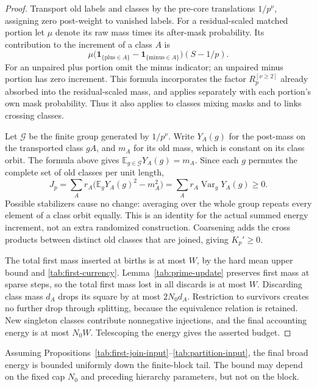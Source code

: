 \begin{proof}
Transport old labels and classes by the pre-core translations
$1/p^\nu$, assigning zero post-weight to vanished labels.
For a residual-scaled matched portion let $\mu$ denote its raw
mass times its after-mask probability.  Its contribution to the
increment of a class $A$ is
\[
 \mu\bigl(\mathbf1_{\{\text{plus}\in A\}}
          -\mathbf1_{\{\text{minus}\in A\}}\bigr)(S-1/p).
\]
For an unpaired plus portion omit the minus indicator; an unpaired
minus portion has zero increment.  This formula incorporates the
factor $R_p^{[\nu\ge2]}$ already absorbed into the residual-scaled
mass, and applies separately with each portion's own mask probability.
Thus it also applies to classes mixing masks and to links crossing
classes.

Let $\mathcal G$ be the finite group generated by $1/p^\nu$.
Write $Y_A(g)$ for the post-mass on the transported class $gA$,
and $m_A$ for its old mass, which is constant on its class orbit.
The formula above gives $\mathbb E_{g\in\mathcal G}Y_A(g)=m_A$.
Since each $g$ permutes the complete set of old classes per unit
length,
\[
 J_p=\sum_A r_A\bigl(\mathbb E_gY_A(g)^2-m_A^2\bigr)
     =\sum_A r_A\operatorname{Var}_g Y_A(g)\ge0.
\]
Possible stabilizers cause no change: averaging over the whole group
repeats every element of a class orbit equally.  This is an identity
for the actual summed energy increment, not an extra randomized
construction.  Coarsening adds the cross products between distinct
old classes that are joined, giving $K_p'\ge0$.

The total first mass inserted at births is at most $W$, by the
hard mean upper bound and \eqref{tab:first-currency}.
Lemma~\ref{tab:prime-update} preserves first mass at sparse steps,
so the total first mass lost in all discards is at most $W$.
Discarding class mass $d_A$ drops its square by at most
$2N_0d_A$.  Restriction to survivors creates no further drop through
splitting, because the equivalence relation is retained.  New
singleton classes contribute nonnegative injections, and the final
accounting energy is at most $N_0W$.  Telescoping the energy gives
the asserted budget.
\end{proof}

\begin{proposition}
\label{tab:energy-bound}
Assuming Propositions~\ref{tab:first-join-input}--\ref{tab:partition-input},
the final broad energy is bounded uniformly down the finite-block
tail.  The bound may depend on the fixed cap $N_0$ and preceding
hierarchy parameters, but not on the block.
\end{proposition}

